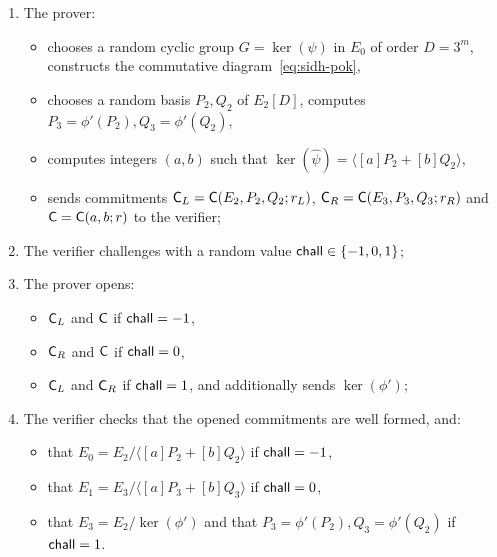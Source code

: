 \begin{enumerate}
    \item The prover:
    \begin{itemize}
        \item chooses a random cyclic group $G = \ker(\psi)$ in $E_0$ of order $D=3^m$, constructs the commutative diagram~\eqref{eq:sidh-pok}, 
        \item chooses a random basis $P_2,Q_2$ of $E_2[D]$, computes $P_3 = \phi'(P_2), Q_3 = \phi'(Q_2)$,
        \item computes integers $(a,b)$ such that $\ker(\widehat\psi) = \langle [a]P_2 + [b]Q_2\rangle$,
        \item sends commitments $\mathsf{C}_L = \mathsf{C}(E_2,P_2,Q_2; r_L)$, $\mathsf{C}_R = \mathsf{C}(E_3,P_3,Q_3; r_R)$ and $\mathsf{C} = \mathsf{C}(a,b; r)$ to the verifier;
    \end{itemize}
    \item The verifier challenges with a random value $\mathsf{chall}\in\{-1,0,1\}$;
    \item The prover opens:
    \begin{itemize}
        \item $\mathsf{C}_L$ and $\mathsf{C}$ if $\mathsf{chall} = -1$,
        \item $\mathsf{C}_R$ and $\mathsf{C}$ if $\mathsf{chall} = 0$,
        \item $\mathsf{C}_L$ and $\mathsf{C}_R$ if $\mathsf{chall} = 1$, and additionally sends $\ker(\phi')$;
    \end{itemize}
    \item The verifier checks that the opened commitments are well formed, and:
    \begin{itemize}
        \item that $E_0 = E_2/\langle [a]P_2 + [b]Q_2\rangle$ if $\mathsf{chall} = -1$,
        \item that $E_1 = E_3/\langle [a]P_3 + [b]Q_3\rangle$ if $\mathsf{chall} = 0$,
        \item that $E_3 = E_2/\ker(\phi')$ and that $P_3 = \phi'(P_2), Q_3 = \phi'(Q_2)$ if $\mathsf{chall} = 1$.
    \end{itemize}
\end{enumerate}



